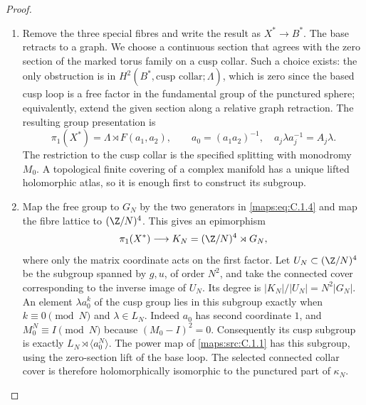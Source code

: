 \begin{proof}
\begin{enumerate}[label=\arabic*.,leftmargin=*]
\item Remove the three special fibres and write the result as $X^*\to B^*$.
The base retracts to a graph. We choose a continuous section that agrees
with the zero section of the marked torus family on a cusp collar.
Such a choice exists: the only obstruction is in
$H^2(B^*,\text{cusp collar};\Lambda)$, which is zero since the based
cusp loop is a free factor in the fundamental group of the punctured
sphere; equivalently, extend the given section along a relative graph
retraction. The resulting group presentation is
\[
 \pi_1(X^*)=\Lambda\rtimes F(a_1,a_2),\qquad
 a_0=(a_1a_2)^{-1},\quad a_j\lambda a_j^{-1}=A_j\lambda.
\]
The restriction to the cusp collar is the specified splitting with
monodromy $M_0$. A topological finite covering of a complex manifold
has a unique lifted holomorphic atlas, so it is enough first to
construct its subgroup.

\item Map the free group to $G_N$ by the two generators in \eqref{maps:eq:C.1.4} and
map the fibre lattice to $(\Z/N)^4$. This gives an epimorphism
\[
 \pi_1(X^*)\longrightarrow
 K_N=(\Z/N)^4\rtimes G_N,
\]
where only the matrix coordinate acts on the first factor. Let
$U_N\subset(\Z/N)^4$ be the subgroup spanned by $g,u$, of order
$N^2$, and take the connected cover corresponding to the inverse
image of $U_N$. Its degree is $|K_N|/|U_N|=N^2|G_N|$.
An element $\lambda a_0^k$ of the cusp group lies in this subgroup
exactly when $k\equiv0\pmod N$ and
$\lambda\in L_N$. Indeed $a_0$ has second coordinate $1$, and
$M_0^N\equiv I\pmod N$ because $(M_0-I)^2=0$.
Consequently its cusp subgroup is exactly
$L_N\rtimes\langle a_0^N\rangle$. The power map of \ref{maps:src:C.1.1} has
this subgroup, using the zero-section lift of the base loop.
The selected connected collar cover is therefore holomorphically
isomorphic to the punctured part of $\kappa_N$.


\end{enumerate}
\end{proof}
